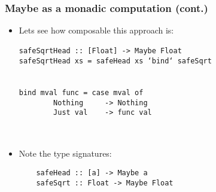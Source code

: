 \documentclass[final,handout]{beamer}
\begin{document}
\begin{frame}[fragile]
    \frametitle{Maybe as a monadic computation (cont.)}
    
    \begin{itemize}
        \item Lets see how composable this approach is:
    {\tt \\~\\
    safeSqrtHead :: [Float] -> Maybe Float\\
    safeSqrtHead xs = safeHead xs `bind` safeSqrt\\
    ~\\
    \\
    bind mval func   = case mval of\\
    ~~~~~~~~Nothing~~~~~-> Nothing\\
    ~~~~~~~~Just val~~~~-> func val\\
    ~\\
    }
    ~

        \item Note the type signatures:

    \begin{verbatim}
    safeHead :: [a] -> Maybe a
    safeSqrt :: Float -> Maybe Float
    \end{verbatim}
    \end{itemize}

\end{frame}
\end{document}

